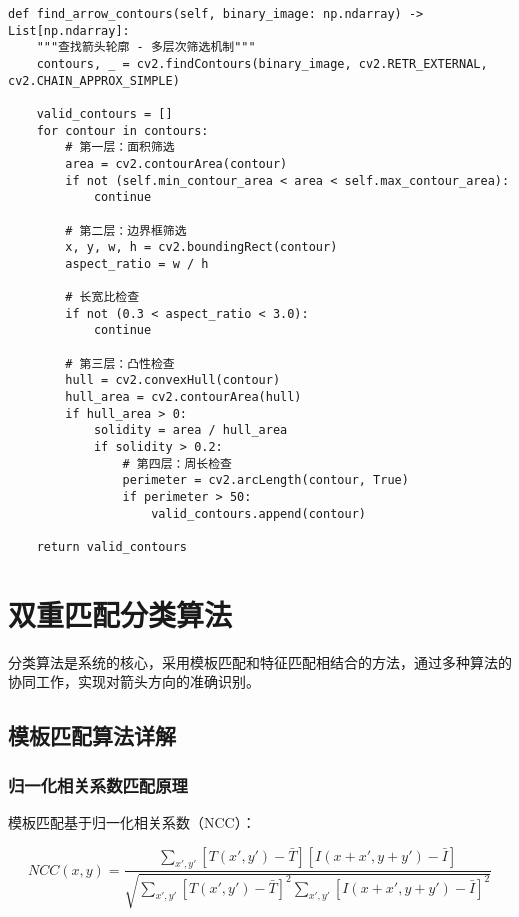 \documentclass[12pt]{article}
\begin{document}
\begin{lstlisting}[caption=智能轮廓筛选算法]
def find_arrow_contours(self, binary_image: np.ndarray) -> List[np.ndarray]:
    """查找箭头轮廓 - 多层次筛选机制"""
    contours, _ = cv2.findContours(binary_image, cv2.RETR_EXTERNAL, cv2.CHAIN_APPROX_SIMPLE)
    
    valid_contours = []
    for contour in contours:
        # 第一层：面积筛选
        area = cv2.contourArea(contour)
        if not (self.min_contour_area < area < self.max_contour_area):
            continue
            
        # 第二层：边界框筛选
        x, y, w, h = cv2.boundingRect(contour)
        aspect_ratio = w / h
        
        # 长宽比检查
        if not (0.3 < aspect_ratio < 3.0):
            continue
            
        # 第三层：凸性检查
        hull = cv2.convexHull(contour)
        hull_area = cv2.contourArea(hull)
        if hull_area > 0:
            solidity = area / hull_area
            if solidity > 0.2:
                # 第四层：周长检查
                perimeter = cv2.arcLength(contour, True)
                if perimeter > 50:
                    valid_contours.append(contour)
    
    return valid_contours
\end{lstlisting}

\section{双重匹配分类算法}

分类算法是系统的核心，采用模板匹配和特征匹配相结合的方法，通过多种算法的协同工作，实现对箭头方向的准确识别。

\subsection{模板匹配算法详解}

\subsubsection{归一化相关系数匹配原理}

模板匹配基于归一化相关系数（NCC）：

\begin{equation}
NCC(x,y) = \frac{\sum_{x',y'} [T(x',y') - \bar{T}][I(x+x',y+y') - \bar{I}]}{\sqrt{\sum_{x',y'} [T(x',y') - \bar{T}]^2 \sum_{x',y'} [I(x+x',y+y') - \bar{I}]^2}}
\end{equation}
\end{document}

